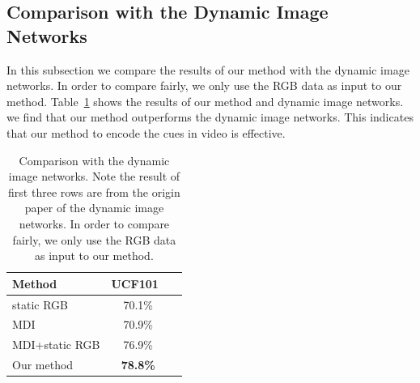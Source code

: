 \documentclass[10pt,twocolumn,letterpaper]{article}
\begin{document}
\subsection{Comparison with the Dynamic Image Networks}
In this subsection we compare the results of our method with the dynamic image networks. In order to compare fairly, we only use the RGB data as input to our method.
Table~\ref{table:compare_din} shows the results of our method and dynamic image networks. we find
that our method outperforms the dynamic image networks. This indicates that 
our method to encode the cues in video is effective. 
\begin{table}
	\begin{center}
		\begin{tabular}{|l|c|c|}
			\hline
			Method 						 		& UCF101~\cite{soomro2012ucf101} 	\\
			\hline
			static RGB					 		& 70.1\% 	\\
			MDI				 		& 70.9\% 	\\
			MDI+static RGB 		& 76.9\% 	\\
			Our method                  	& \textbf{78.8\%} \\
			\hline
		\end{tabular}
	\end{center}
	\caption{Comparison with the dynamic image networks. Note the result of first three rows are from the origin paper of the dynamic image networks. In order to compare fairly, we only use the RGB data as input to our method.}
	\label{table:compare_din}
\end{table}

\end{document}
